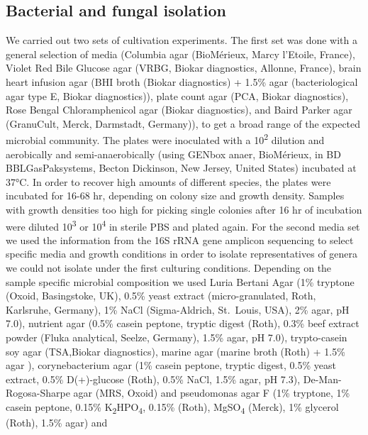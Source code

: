 \documentclass[preprint, 3p,
authoryear]{elsarticle} %
\begin{document}
\hypertarget{bacterial-and-fungal-isolation}{%
\subsection{Bacterial and fungal
isolation}\label{bacterial-and-fungal-isolation}}

We carried out two sets of cultivation experiments. The first set was
done with a general selection of media (Columbia agar (BioMérieux, Marcy
l'Etoile, France), Violet Red Bile Glucose agar (VRBG, Biokar
diagnostics, Allonne, France), brain heart infusion agar (BHI broth
(Biokar diagnostics) + 1.5\% agar (bacteriological agar type E, Biokar
diagnostics)), plate count agar (PCA, Biokar diagnostics), Rose Bengal
Chloramphenicol agar (Biokar diagnostics), and Baird Parker agar
(GranuCult\texttrademark, Merck, Darmstadt, Germany)), to get a broad
range of the expected microbial community. The plates were inoculated
with a 10\textsuperscript{2} dilution and aerobically and
semi-anaerobically (using GENbox anaer, BioMérieux, in BD
BBL\texttrademark GasPak\texttrademark systems, Becton Dickinson, New
Jersey, United States) incubated at 37°C. In order to recover high
amounts of different species, the plates were incubated for 16-68 hr,
depending on colony size and growth density. Samples with growth
densities too high for picking single colonies after 16 hr of incubation
were diluted 10\textsuperscript{3} or 10\textsuperscript{4} in sterile
PBS and plated again. For the second media set we used the information
from the 16S rRNA gene amplicon sequencing to select specific media and
growth conditions in order to isolate representatives of genera we could
not isolate under the first culturing conditions. Depending on the
sample specific microbial composition we used Luria Bertani Agar (1\%
tryptone (Oxoid, Basingstoke, UK), 0.5\% yeast extract
(micro-granulated, Roth, Karlsruhe, Germany), 1\% NaCl (Sigma-Aldrich,
St.~Louis, USA), 2\% agar, pH 7.0), nutrient agar (0.5\% casein peptone,
tryptic digest (Roth), 0.3\% beef extract powder (Fluka analytical,
Seelze, Germany), 1.5\% agar, pH 7.0), trypto-casein soy agar
(TSA,Biokar diagnostics), marine agar (marine broth (Roth) + 1.5\% agar
), corynebacterium agar (1\% casein peptone, tryptic digest, 0.5\% yeast
extract, 0.5\% D(+)-glucose (Roth), 0.5\% NaCl, 1.5\% agar, pH 7.3),
De-Man-Rogosa-Sharpe agar (MRS, Oxoid) and pseudomonas agar F (1\%
tryptone, 1\% casein peptone, 0.15\%
K\textsubscript{2}HPO\textsubscript{4}, 0.15\% (Roth),
MgSO\textsubscript{4} (Merck), 1\% glycerol (Roth), 1.5\% agar) and
\end{document}
